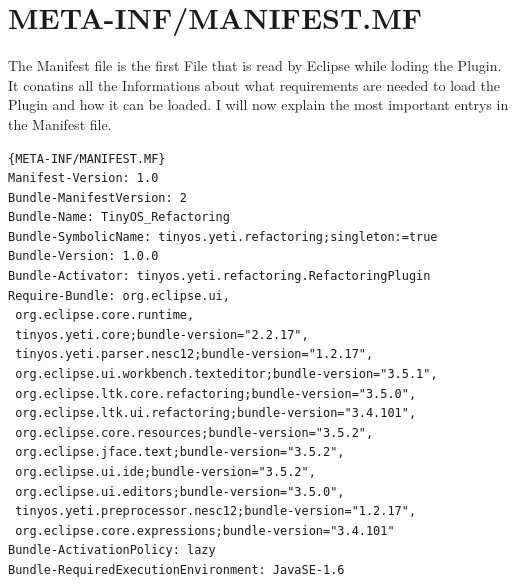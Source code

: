 \documentclass[a4paper,10pt]{report}
\begin{document}
\section{META-INF/MANIFEST.MF}
The Manifest file is the first File that is read by Eclipse while loding the Plugin. It conatins all the Informations about what requirements 
are needed to load the Plugin and how it can be loaded. I will now explain the most important entrys in the Manifest file.

\begin{lstlisting}[caption=MANIFEST]{META-INF/MANIFEST.MF}
Manifest-Version: 1.0
Bundle-ManifestVersion: 2
Bundle-Name: TinyOS_Refactoring
Bundle-SymbolicName: tinyos.yeti.refactoring;singleton:=true
Bundle-Version: 1.0.0
Bundle-Activator: tinyos.yeti.refactoring.RefactoringPlugin
Require-Bundle: org.eclipse.ui,
 org.eclipse.core.runtime,
 tinyos.yeti.core;bundle-version="2.2.17",
 tinyos.yeti.parser.nesc12;bundle-version="1.2.17",
 org.eclipse.ui.workbench.texteditor;bundle-version="3.5.1",
 org.eclipse.ltk.core.refactoring;bundle-version="3.5.0",
 org.eclipse.ltk.ui.refactoring;bundle-version="3.4.101",
 org.eclipse.core.resources;bundle-version="3.5.2",
 org.eclipse.jface.text;bundle-version="3.5.2",
 org.eclipse.ui.ide;bundle-version="3.5.2",
 org.eclipse.ui.editors;bundle-version="3.5.0",
 tinyos.yeti.preprocessor.nesc12;bundle-version="1.2.17",
 org.eclipse.core.expressions;bundle-version="3.4.101"
Bundle-ActivationPolicy: lazy
Bundle-RequiredExecutionEnvironment: JavaSE-1.6
\end{lstlisting}
\end{document}
